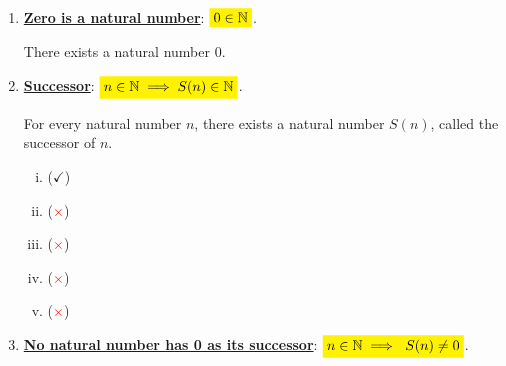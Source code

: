 \begin{enumerate}[\bf 1.]
	\item \textbf{\underline{Zero is a natural number}}: \(\mathcolorbox{yellow}{0 \in\N}\).
	
	There exists a natural number \(0\).\vspace{12pt}
	\item \textbf{\underline{Successor}}: \(\mathcolorbox{yellow}{n\in\N\implies S(n)\in\N}\).
	
	For every natural number \(n\), there exists a natural number \(S(n)\), called the successor of \(n\).
	\begin{enumerate}[(i)]
		\item (\textcolor{green!50!black}{$\boldsymbol{\checkmark}$})
		\item (\textcolor{red}{$\boldsymbol{\times}$})
		\item (\textcolor{red}{$\boldsymbol{\times}$}) \begin{center}
		\end{center}
		\item (\textcolor{red}{$\boldsymbol{\times}$}) \begin{center}
		\end{center}
		\item (\textcolor{red}{$\boldsymbol{\times}$}) \begin{center}
		\end{center}
	\end{enumerate}
	\vspace{12pt}
	\item \textbf{\underline{No natural number has 0 as its successor}}: \(\mathcolorbox{yellow}{n \in \mathbb{N}\implies \ S(n) \neq 0}\).
	

\end{enumerate}
